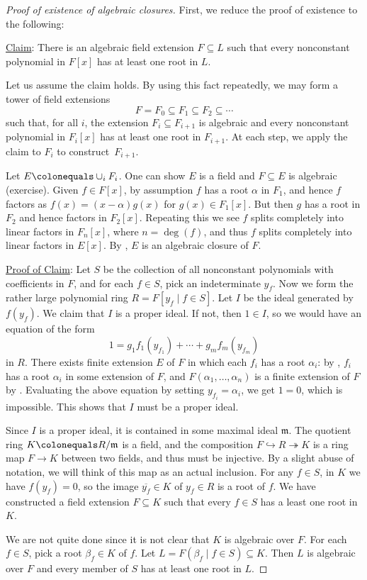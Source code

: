 \documentclass[12pt]{report}
\numberwithin{equation}{section}
\numberwithin{theorem}{chapter}
\theoremstyle{definition}
\newtheorem*{basic properties}{Basic Properties}
\newtheorem*{Important Remark}{Important Remark}
\newcommand{\m}{\mathfrak{m}}
\begin{document}
\begin{proof}[Proof of existence of algebraic closures]
First, we reduce the proof of existence to the following:

\underline{Claim}: There is an algebraic field extension $F \subseteq L$ such that every nonconstant polynomial in $F[x]$ has at least one root in $L$.

Let us assume the claim holds. By using this fact repeatedly, we may form a tower of field extensions
$$F = F_0 \subseteq F_1 \subseteq F_2 \subseteq  \cdots$$
such that, for all $i$, the extension $F_i \subseteq F_{i+1}$ is algebraic and every nonconstant polynomial in $F_i[x]$ has at least one root in $F_{i+1}$. At each step, we apply the claim to $F_i$ to construct~$F_{i+1}$.

Let $E \colonequals \cup_i F_i$. One can show $E$ is a field and $F \subseteq E$ is algebraic (exercise). 
Given $f \in F[x]$, by assumption $f$ has a root $\alpha$ in $F_1$, and hence $f$ factors as $f(x) = (x-\alpha) g(x)$ for $g(x) \in F_1[x]$. But then $g$ has a root in $F_2$ and hence factors in $F_2[x]$. Repeating this we see $f$ splits completely into linear factors in $F_n[x]$, where $n = \deg(f)$, and thus $f$ splits completely into linear factors in $E[x]$. By , $E$ is an algebraic closure of $F$.

\underline{Proof of Claim}:
Let $S$ be the collection of all nonconstant polynomials with coefficients in $F$, and for each $f \in S$, pick an indeterminate $y_f$.
Now we form the rather large polynomial ring $R = F[y_f \mid f \in S]$. Let $I$ be the ideal generated by $f(y_f)$. We claim that  $I$ is a proper ideal. If not, then $1 \in I$, so we would have an equation of the form
$$1 = g_1 f_1(y_{f_1}) + \cdots + g_m f_m(y_{f_m})$$
in $R$. There exists finite extension $E$ of $F$ in which each $f_i$ has a root $\alpha_i$: by , $f_i$ has a root $\alpha_i$ in some extension of $F$, and $F(\alpha_1, \ldots, \alpha_n)$ is a finite extension of $F$ by . Evaluating the above equation by setting $y_{f_i} = \alpha_i$, we get $1 = 0$, which is impossible. This shows that $I$ must be a proper ideal. 

Since $I$ is a proper ideal, it is contained in some maximal ideal $\m$. The quotient ring $K \colonequals R/\m$ is a field, and the composition $F \hookrightarrow R \twoheadrightarrow K$ is a ring map $F \to K$ between two fields, and thus must be injective. By a slight abuse of notation, we will think of this map as an actual inclusion. 
For any $f \in S$, in $K$ we have $f(y_f) = 0$, so the image $\overline{y_f} \in K$ of $y_f \in R$ is a root of $f$. We have constructed a field extension $F \subseteq K$ such that every $f \in S$ has a least one root in~$K$. 

We are not quite done since it is not clear that $K$ is algebraic over $F$. For each $f \in S$, pick a root $\beta_f \in K$ of $f$. Let $L=F(\beta_f \mid f \in S) \subseteq K$.
Then $L$ is algebraic over $F$ and every member of $S$ has at least one root in $L$.
\end{proof}
\end{document}
